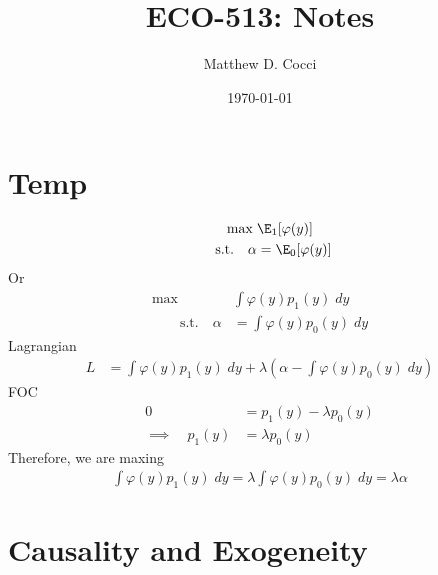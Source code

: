 \documentclass[12pt]{article}
\author{Matthew D. Cocci}
\title{ECO-513: Notes}
\date{\today}
\theoremstyle{plain}
\theoremstyle{definition}
\theoremstyle{remark}
\begin{document}
\maketitle

\tableofcontents


\clearpage
\section{Temp}

\begin{align*}
  \max
  \;&\E_1[\varphi(y)]
  \\
  \qquad \text{s.t.}\quad
  \alpha
  &= \E_0[\varphi(y)]
\end{align*}
Or
\begin{align*}
  \max
  \;&
  \int \varphi(y)p_1(y)\;dy
  \\
  \qquad \text{s.t.}\quad
  \alpha
  &= \int\varphi(y)p_0(y)\;dy
\end{align*}
Lagrangian
\begin{align*}
  L
  &=
  \int \varphi(y)p_1(y)\;dy
  +
  \lambda
  \left(
  \alpha
  - \int\varphi(y)p_0(y)\;dy
  \right)
\end{align*}
FOC
\begin{align*}
  0
  &=
  p_1(y)
  -
  \lambda
  p_0(y)
  \\
  \implies\quad
  p_1(y)
  &=
  \lambda
  p_0(y)
\end{align*}
Therefore, we are maxing
\begin{align*}
  \int\varphi(y)p_1(y)\;dy
  =
  \lambda\int\varphi(y)p_0(y)\;dy
  = \lambda\alpha
\end{align*}



\clearpage
\section{Causality and Exogeneity}
\end{document}
